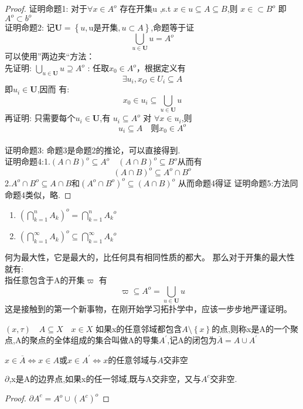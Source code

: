 \begin{proof}
    证明命题1: 对于\(\forall x\in A^{o}\) 存在开集u ,s.t \(x \in u \subseteq A \subseteq B\),则 \(x \in \subset B^{o}\)
    即\(A^{o} \subset b^{o}\) \\
    证明命题2: 记\(\mathbf{U}=\left\{u,\text{u是开集},u\subset A\right\}\),命题等于证 \[\bigcup_{u \in \mathbf{U}}u=A^{o}\]
    可以使用”两边夹“方法： \\
    先证明: \(\bigcup_{u \in \mathbf{U}}u \supseteq A^{o}\) : 任取\(x_0 \in A^{o}\)，根据定义有 \[\exists u_i , x_O \in U_i \subseteq A \]
    即\(u_i \in \mathbf{U}\),因而 有:\[x_0 \in u_i \subseteq \bigcup_{u \in \mathbf{U}}u\]
    再证明: 只需要每个\(u_i \in \mathbf{U}\),有 \(u_i \subseteq A^{o}\) 对 \(\forall x \in u_i\),则
    \[u_i \subseteq A \quad \text{则} x_0 \in A ^{o}\] \\
    证明命题3: 命题3是命题2的推论，可以直接得到. \\
    证明命题4:1.\({\left(A \cap B\right)}^{o}\subseteq A^{o} \quad {\left(A \cap B\right)}^{o}\subseteq B^{o}\)从而有 
    \[{\left(A \cap B\right)}^{o}\subseteq A^{o}\cap B^{o}\]
    2.\(A^{o}\cap B^{o} \subseteq A \cap B\)和\({\left(A^{o}\cap B^{o}\right)}^{o}\subseteq {\left(A\cap B\right)}^{o}\)
    从而命题4得证
    证明命题5:方法同命题4类似，略.
\end{proof}
\begin{note}[命题四]
    \begin{enumerate}
        \item \({\left(\bigcap_{k=1}^{n} A_k\right)}^{o}=\bigcap_{k=1}^{n}{A_k}^{o}\)\\
        \item \({\left(\bigcap_{k=1}^{\infty} A_k\right)}^{o} \subseteq \bigcap_{k=1}^{\infty}{A_k}^{o}\)
    \end{enumerate}
\end{note}
\begin{note}
    何为最大性，它是最大的，比任何具有相同性质的都大。 那么对于开集的最大性就有: \\
    指任意包含于A的开集\(\varpi\) 有
    \[\varpi \subseteq A^{o} =\bigcup_{u \in \mathbf{U}} u\]
    这是接触到的第一个新事物，在刚开始学习拓扑学中，应该一步步地严谨证明。
\end{note}
\begin{Definition}
    \( \left(x,\tau\right) \quad A \subseteq X \quad x \in X\) 如果x的任意邻域都包含\(A \setminus \left\{x\right\}\)的点,则称x是A的一个聚点,A的聚点的全体组成的集合叫做A的导集\(A^{'}\),记A的闭包为\(\overline{A}=A \cup A^{'}\)
\end{Definition}
\(x \in \overline{A} \Leftrightarrow x \in A 或 x\in A^{'} \Leftrightarrow x的任意邻域与A交非空\)
\begin{Definition}[边界点]
    \(\partial\),x是A的边界点,如果x的任一邻域,既与A交非空，又与\(A^{c}\)交非空.
\end{Definition}
\begin{proof}
    \({\partial A }^c =A^o \cup {\left(A^c\right)}^o\)
\end{proof}
